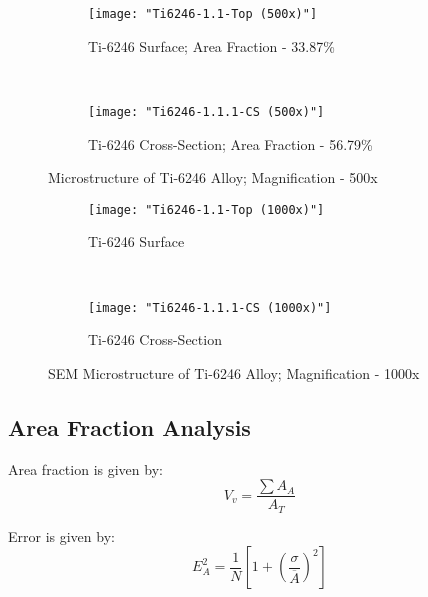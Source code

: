 \begin{figure}[H]
    \centering
    \begin{subfigure}{0.49\textwidth}
        \texttt{[image: "Ti6246-1.1-Top (500x)"]}
        \caption{Ti-6246 Surface; Area Fraction - 33.87\%}
        \label{fig:a-As-Received-micro}
    \end{subfigure}
    ~
    \begin{subfigure}{0.49\textwidth}
        \texttt{[image: "Ti6246-1.1.1-CS (500x)"]}
        \caption{Ti-6246 Cross-Section; Area Fraction - 56.79\%}
        \label{fig:b-As-Received-micro}
    \end{subfigure}
  
    \caption{Microstructure of Ti-6246 Alloy; Magnification - 500x}
    \label{fig:As-Received-micro}
\end{figure}


\begin{figure}[H]
    \centering
    \begin{subfigure}{0.49\textwidth}
        \texttt{[image: "Ti6246-1.1-Top (1000x)"]}
        \caption{Ti-6246 Surface}
        \label{fig:2a}
    \end{subfigure}
    ~
    \begin{subfigure}{0.49\textwidth}
        \texttt{[image: "Ti6246-1.1.1-CS (1000x)"]}
        \caption{Ti-6246 Cross-Section}
        \label{fig:2a}
    \end{subfigure}
  
    \caption{SEM Microstructure of Ti-6246 Alloy; Magnification - 1000x}
    \label{fig:As-Received-SEM}
\end{figure}

\subsection{Area Fraction Analysis}
Area fraction is given by:
\begin{equation}
V_{v} = \dfrac{\sum A_{A}}{A_{T}}
\end{equation} 

Error is given by:
\begin{equation}
E_{A}^{2} = \dfrac{1}{N}\left[ 1+ \left( \dfrac{\sigma}{\overline A} \right)^{2} \right]
\end{equation} 

